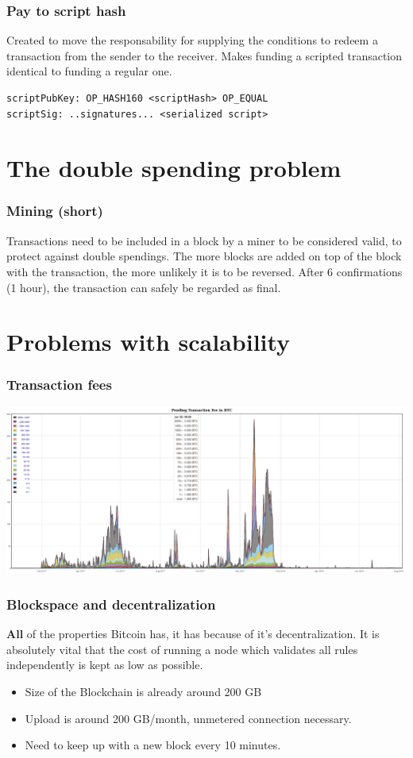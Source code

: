 \documentclass{beamer}
\begin{document}
\begin{frame}[fragile]
\frametitle{Pay to script hash}
Created to move the responsability for supplying the conditions to 
redeem a transaction from the sender to the receiver. Makes funding a scripted transaction identical to funding a regular one.
\begin{verbatim}
scriptPubKey: OP_HASH160 <scriptHash> OP_EQUAL 
scriptSig: ..signatures... <serialized script>
\end{verbatim}
\end{frame}
\section{The double spending problem}
\begin{frame}
\frametitle{Mining (short)}
Transactions need to be included in a block by a miner to be considered valid, to protect against double spendings. The more blocks are added  on top of the block with the transaction, the more unlikely it is to be reversed. After 6 confirmations (1 hour), the transaction can safely be regarded as final.
\end{frame}
\section{Problems with scalability}
\begin{frame}
\frametitle{Transaction fees}
\includegraphics[scale=0.25]{images/fees.png}
\end{frame}
\begin{frame}
\frametitle{Blockspace and decentralization}
\textbf{All} of the properties Bitcoin has, it has because of it's decentralization. It is absolutely vital that the cost of running a node which validates all rules independently is kept as low as possible.
\begin{itemize}
\item Size of the Blockchain is already around 200 GB
\item Upload is around 200 GB/month, unmetered connection necessary.
\item Need to keep up with a new block every 10 minutes.
\end{itemize}
\end{frame}
\end{document}
